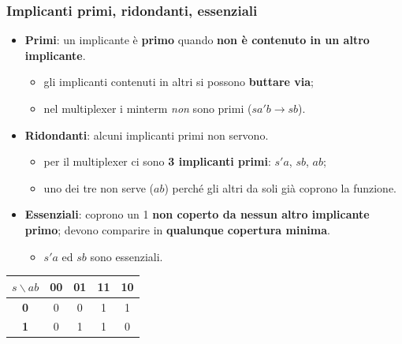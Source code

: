 \documentclass[12pt, a4paper]{article}
\begin{document}
\subsubsection{Implicanti primi, ridondanti, essenziali}
\begin{itemize}
    \item \textcolor{red!80!black}{\textbf{Primi}}: un implicante è \textbf{primo} quando \textbf{non è contenuto in un altro implicante}.
    \begin{itemize}
        \item gli implicanti contenuti in altri si possono \textbf{buttare via};
        \item nel multiplexer i minterm \emph{non} sono primi ($sa'b \to sb$).
    \end{itemize}
    \item \textcolor{red!80!black}{\textbf{Ridondanti}}: alcuni implicanti primi non servono.
    \begin{itemize}
        \item per il multiplexer ci sono \textbf{3 implicanti primi}: $s'a$, $sb$, $ab$;
        \item uno dei tre non serve ($ab$) perché gli altri da soli già coprono la funzione.
    \end{itemize}
    \item \textcolor{green!50!black}{\textbf{Essenziali}}: coprono un 1 \textbf{non coperto da nessun altro implicante primo}; devono comparire in \textbf{qualunque copertura minima}.
    \begin{itemize}
        \item $s'a$ ed $sb$ sono essenziali.
    \end{itemize}
\end{itemize}

\begin{center}
\renewcommand{\arraystretch}{1.25}
\begin{tabular}[t]{|c|c|c|c|c|}
\hline
\colorbox{gray!25}{\color{black}$s\backslash ab$} & \colorbox{gray!25}{\color{black}\textbf{00}} & \colorbox{gray!25}{\color{black}\textbf{01}} & \colorbox{gray!25}{\color{black}\textbf{11}} & \colorbox{gray!25}{\color{black}\textbf{10}} \\ \hline
\colorbox{gray!25}{\color{black}\textbf{0}} & 0 & 0 & \colorbox{green!30}{\color{black}1} & \colorbox{green!30}{\color{black}1} \\ \hline
\colorbox{gray!25}{\color{black}\textbf{1}} & 0 & \colorbox{yellow!55}{\color{black}1} & \colorbox{yellow!55}{\color{black}1} & 0 \\ \hline
\end{tabular}
\end{center}
\end{document}

